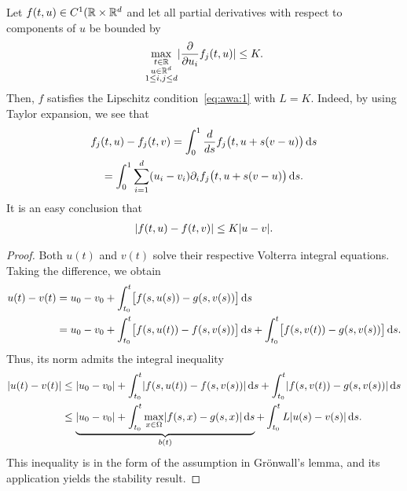 \begin{example}
  Let $f(t,u)\in C^1(\mathbb R \times\mathbb R^d $ and let all partial derivatives
  with respect to components of $u$ be bounded by
  \begin{gather*}
    \max_{\substack{t\in \mathbb R\\u\in \mathbb R^d\\1\le i,j \le d}}
   \lvert
     \frac{\partial}{\partial u_i} f_j(t,u)
   \rvert \le K.
  \end{gather*}
  Then, $f$ satisfies the Lipschitz condition~\eqref{eq:awa:1} with
  $L=K$. Indeed, by using Taylor expansion, we see that
  \begin{multline*}
    f_j(t, u) - f_j(t,v)
    = \int_0^1 \frac{d}{ds}f_j\bigl(t,u+s(v-u)\bigr)\,\mathrm{d} s\\
    = \int_0^1 \sum_{i=1}^d(u_i-v_i)\partial_if_j\bigl(t,u+s(v-u)\bigr)\,\mathrm{d} s.
  \end{multline*}
  It is an easy conclusion that
  \begin{gather*}
    \lvert f(t,u)-f(t,v)\rvert
    \le K \lvert u-v\rvert.
  \end{gather*}
\end{example}




\begin{proof}
  Both $u(t)$ and $v(t)$ solve their respective Volterra integral
  equations. Taking the difference, we obtain
  \begin{align*}
    u(t)-v(t) &= u_0-v_0
           + \int_{t_0}^t \bigl[ f(s,u(s)) - g(s,v(s)) \bigr]\,\mathrm{d} s
    \\
         &= u_0-v_0
           + \int_{t_0}^t \bigl[ f(s,u(t)) - f(s,v(s)) \bigr]\,\mathrm{d} s
           + \int_{t_0}^t \bigl[ f(s,v(t)) - g(s,v(s)) \bigr]\,\mathrm{d} s.
  \end{align*}
  Thus, its norm admits the integral inequality
  \begin{align*}
    \lvert u(t)-v(t)\rvert
    &\le \lvert u_0-v_0\rvert + \int_{t_0}^t\lvert f(s,u(t)) - f(s,v(s))\rvert \,\mathrm{d} s
    + \int_{t_0}^t \lvert f(s,v(t)) - g(s,v(s))\rvert \,\mathrm{d} s
    \\
    &\le \underbrace{\lvert u_0-v_0\rvert
      + \int_{t_0}^t \max_{x\in\Omega} \lvert f(s,x)-g(s,x)\rvert\,\mathrm{d} s}_{b(t)}
      + \int_{t_0}^t L \lvert u(s)-v(s)\rvert \,\mathrm{d} s.
  \end{align*}
  This inequality is in the form of the assumption in Grönwall's
  lemma, and its application yields the stability result.
\end{proof}





